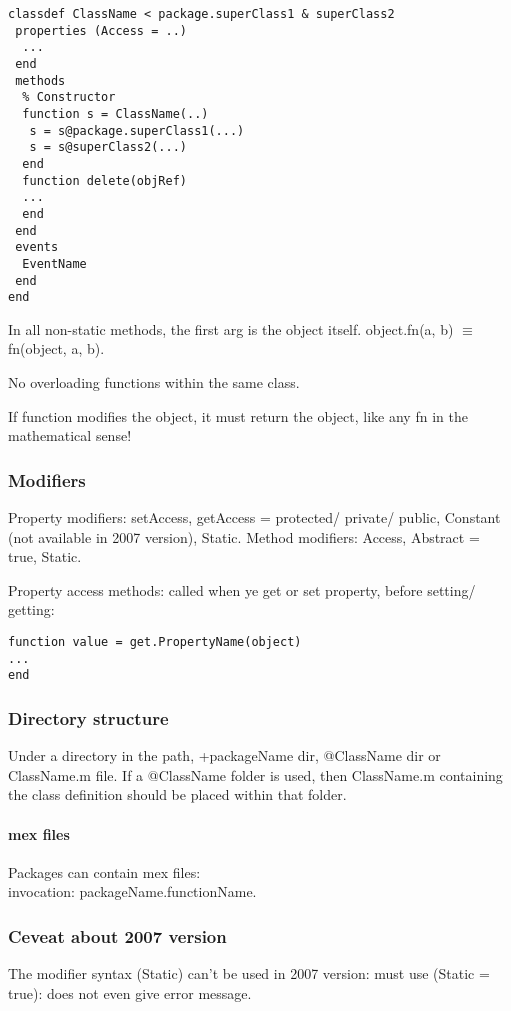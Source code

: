 \documentclass[oneside, article]{memoir}
\begin{document}
\begin{verbatim}
classdef ClassName < package.superClass1 & superClass2
 properties (Access = ..)
  ...
 end
 methods
  % Constructor
  function s = ClassName(..)
   s = s@package.superClass1(...)
   s = s@superClass2(...)
  end
  function delete(objRef)
  ...
  end
 end
 events
  EventName
 end
end
\end{verbatim}

In all non-static methods, the first arg is the object itself. object.fn(a, b) $\equiv$ fn(object, a, b).

No overloading functions within the same class.

If function modifies the object, it must return the object, like any fn in the mathematical sense!

\subsubsection{Modifiers}
Property modifiers: setAccess, getAccess = protected/ private/ public, Constant (not available in 2007 version), Static. Method modifiers: Access, Abstract = true, Static.

Property access methods: called when ye get or set property, before setting/ getting:
\begin{verbatim}
function value = get.PropertyName(object)
...
end
\end{verbatim}

\subsubsection{Directory structure}
Under a directory in the path, +packageName dir, @ClassName dir or ClassName.m file. If a @ClassName folder is used, then ClassName.m containing the class definition should be placed within that folder.

\paragraph*{mex files}
Packages can contain mex files: \\
invocation: packageName.functionName.

\subsubsection{Ceveat about 2007 version}
The modifier syntax (Static) can't be used in 2007 version: must use (Static = true): does not even give error message.
\end{document}
